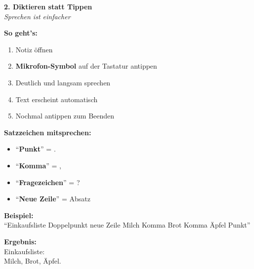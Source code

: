 \documentclass[a4paper,landscape,8pt]{extarticle}
\begin{document}
\hfill%
\begin{minipage}[t]{0.32\linewidth}
\begin{center}
\colorbox{dictblue!10}{%
\begin{minipage}{0.95\linewidth}
\vspace{2mm}
\begin{center}
{\Large\bfseries\textcolor{dictblue}{2. Diktieren statt Tippen}}\\[1pt]
{\footnotesize\itshape Sprechen ist einfacher}
\end{center}
\vspace{2mm}
\end{minipage}%
}
\end{center}

\vspace{1mm}

\textbf{So geht's:}
\begin{enumerate}
\item Notiz öffnen
\item \textbf{Mikrofon-Symbol} auf der Tastatur antippen
\item Deutlich und langsam sprechen
\item Text erscheint automatisch
\item Nochmal antippen zum Beenden
\end{enumerate}

\textbf{Satzzeichen mitsprechen:}
\begin{itemize}
\item ``\textbf{Punkt}'' = .
\item ``\textbf{Komma}'' = ,
\item ``\textbf{Fragezeichen}'' = ?
\item ``\textbf{Neue Zeile}'' = Absatz
\end{itemize}

\textbf{Beispiel:}\\
``Einkaufsliste Doppelpunkt neue Zeile Milch Komma Brot Komma Äpfel Punkt''

\textbf{Ergebnis:}\\
Einkaufsliste:\\
Milch, Brot, Äpfel.

\vspace{2mm}

\end{minipage}%
\end{document}
